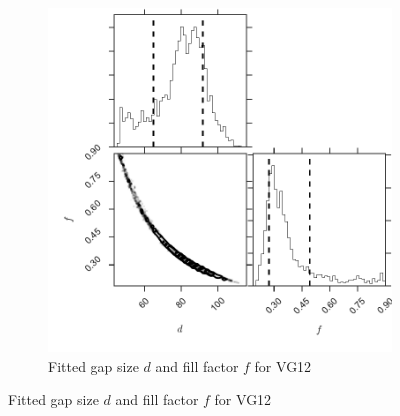 \documentclass[osajnl,preprint,showpacs,superscriptaddress,12pt]{revtex4-1} %
\begin{document}
\begin{figure}[htbp]
        \centering
        \begin{subfigure}[b]{0.5\textwidth}
              \includegraphics[width=\textwidth]{figs/VG12_corner.pdf}
              \caption{Fitted gap size $d$ and fill factor $f$ for VG12}
		\label{figVG12_corner}
        \end{subfigure}
	

\end{figure}
\end{document}

